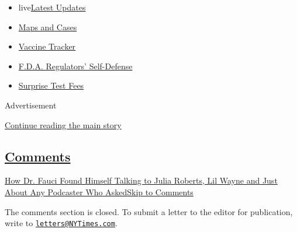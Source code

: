 \begin{itemize}
\tightlist
\item
  live\href{https://www.nytimes3xbfgragh.onion/2020/09/11/world/covid-19-coronavirus.html?name=styln-coronavirus-national\&region=TOP_BANNER\&block=storyline_menu_recirc\&action=click\&pgtype=Interactive\&impression_id=caee8ed1-f4d3-11ea-b0c3-9b7cad4a02b8\&variant=undefined}{Latest
  Updates}
\item
  \href{https://www.nytimes3xbfgragh.onion/interactive/2020/us/coronavirus-us-cases.html?name=styln-coronavirus-national\&region=TOP_BANNER\&block=storyline_menu_recirc\&action=click\&pgtype=Interactive\&impression_id=caeeb5e0-f4d3-11ea-b0c3-9b7cad4a02b8\&variant=undefined}{Maps
  and Cases}
\item
  \href{https://www.nytimes3xbfgragh.onion/interactive/2020/science/coronavirus-vaccine-tracker.html?name=styln-coronavirus-national\&region=TOP_BANNER\&block=storyline_menu_recirc\&action=click\&pgtype=Interactive\&impression_id=caeeb5e1-f4d3-11ea-b0c3-9b7cad4a02b8\&variant=undefined}{Vaccine
  Tracker}
\item
  \href{https://www.nytimes3xbfgragh.onion/2020/09/10/us/politics/fda-coronavirus-vaccine.html?name=styln-coronavirus-national\&region=TOP_BANNER\&block=storyline_menu_recirc\&action=click\&pgtype=Interactive\&impression_id=caeeb5e2-f4d3-11ea-b0c3-9b7cad4a02b8\&variant=undefined}{F.D.A.
  Regulators' Self-Defense}
\item
  \href{https://www.nytimes3xbfgragh.onion/2020/09/09/upshot/coronavirus-surprise-test-fees.html?name=styln-coronavirus-national\&region=TOP_BANNER\&block=storyline_menu_recirc\&action=click\&pgtype=Interactive\&impression_id=caeeb5e3-f4d3-11ea-b0c3-9b7cad4a02b8\&variant=undefined}{Surprise
  Test Fees}
\end{itemize}

Advertisement

\protect\hyperlink{after-top}{Continue reading the main story}

\hypertarget{comments}{%
\subsection{\texorpdfstring{\protect\hyperlink{commentsContainer}{Comments}}{Comments}}\label{comments}}

\href{}{How Dr. Fauci Found Himself Talking to Julia Roberts, Lil Wayne
and Just About Any Podcaster Who Asked}\href{}{Skip to Comments}

The comments section is closed. To submit a letter to the editor for
publication, write to
\href{mailto:letters@NYTimes.com}{\nolinkurl{letters@NYTimes.com}}.

